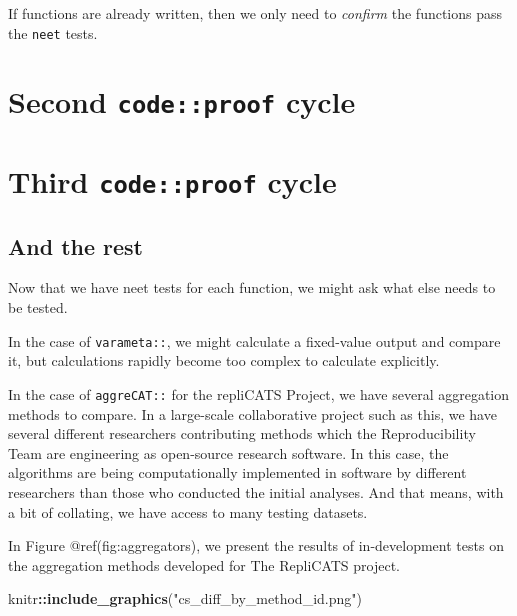 \documentclass[
]{article}
\newenvironment{Shaded}{\begin{snugshade}}{\end{snugshade}}
\newcommand{\KeywordTok}[1]{\textcolor[rgb]{0.13,0.29,0.53}{\textbf{#1}}}
\newcommand{\NormalTok}[1]{#1}
\newcommand{\OperatorTok}[1]{\textcolor[rgb]{0.81,0.36,0.00}{\textbf{#1}}}
\newcommand{\StringTok}[1]{\textcolor[rgb]{0.31,0.60,0.02}{#1}}
\begin{document}
If functions are already written, then we only need to \emph{confirm}
the functions pass the \texttt{neet} tests.

\hypertarget{second-codeproof-cycle}{%
\section{\texorpdfstring{Second \texttt{code::proof}
cycle}{Second code::proof cycle}}\label{second-codeproof-cycle}}

\hypertarget{third-codeproof-cycle}{%
\section{\texorpdfstring{Third \texttt{code::proof}
cycle}{Third code::proof cycle}}\label{third-codeproof-cycle}}

\hypertarget{and-the-rest}{%
\subsection{And the rest}\label{and-the-rest}}

Now that we have neet tests for each function, we might ask what else
needs to be tested.

In the case of \texttt{varameta::}, we might calculate a fixed-value
output and compare it, but calculations rapidly become too complex to
calculate explicitly.

In the case of \texttt{aggreCAT::} for the repliCATS Project, we have
several aggregation methods to compare. In a large-scale collaborative
project such as this, we have several different researchers contributing
methods which the Reproducibility Team are engineering as open-source
research software. In this case, the algorithms are being
computationally implemented in software by different researchers than
those who conducted the initial analyses. And that means, with a bit of
collating, we have access to many testing datasets.

In Figure @ref(fig:aggregators), we present the results of
in-development tests on the aggregation methods developed for The
RepliCATS project.

\begin{Shaded}
\begin{Highlighting}[]
\NormalTok{knitr}\OperatorTok{::}\KeywordTok{include\_graphics}\NormalTok{(}\StringTok{"cs\_diff\_by\_method\_id.png"}\NormalTok{)}
\end{Highlighting}
\end{Shaded}
\end{document}
